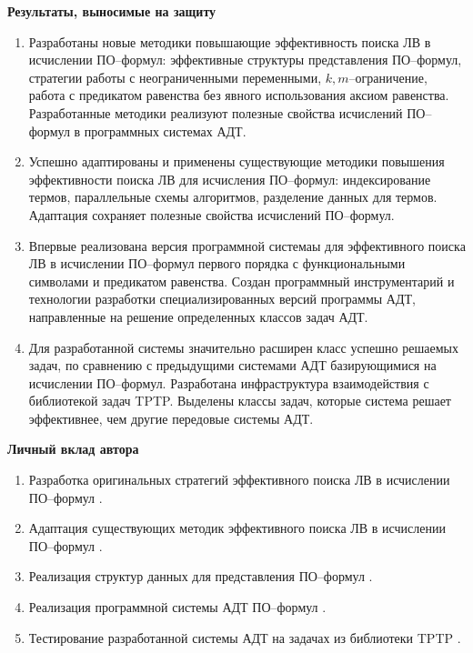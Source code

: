 \documentclass[a4paper]{report}
\begin{document}
\textbf{Результаты, выносимые на защиту}
\begin{enumerate}

\item Разработаны новые методики повышающие эффективность поиска ЛВ в исчислении ПО--формул: эффективные структуры представления ПО--формул, стратегии работы с неограниченными переменными, $k,m$--ограничение, работа с предикатом равенства без явного использования аксиом равенства. Разработанные методики реализуют полезные свойства исчислений ПО--формул в программных системах АДТ.

\item Успешно адаптированы и применены существующие методики повышения эффективности поиска ЛВ для исчисления ПО--формул: индексирование термов, параллельные схемы алгоритмов, разделение данных для термов. Адаптация сохраняет полезные свойства исчислений ПО--формул.

\item Впервые реализована версия программной системаы для эффективного поиска ЛВ в исчислении ПО--формул первого порядка с функциональными символами и предикатом равенства. Создан программный инструментарий и технологии разработки специализированных версий программы АДТ, направленные на решение определенных классов задач АДТ.

\item Для разработанной системы значительно расширен класс успешно решаемых задач, по сравнению с предыдущими системами АДТ базирующимися на исчислении ПО--формул. Разработана инфраструктура взаимодействия с библиотекой задач TPTP. Выделены классы задач, которые система решает эффективнее, чем другие передовые системы АДТ.
\end{enumerate}


\textbf{Личный вклад автора}
\begin{enumerate}
\item Разработка оригинальных стратегий эффективного поиска ЛВ в исчислении ПО--формул \cite{mais, burvestm, viner, QUANT4, mipro}.
\item Адаптация существующих методик эффективного поиска ЛВ в исчислении ПО--формул \cite{mais, parallel, viner, mipro}.
\item Реализация структур данных для представления ПО--формул \cite{mais, viner, mipro, QUANT4}.
\item Реализация программной системы АДТ ПО--формул \cite{parallel, burvest, viner, mipro, QUANT4}.
\item Тестирование разработанной системы АДТ на задачах из библиотеки TPTP \cite{parallel, viner, mipro}.
\end{enumerate}
\end{document}
